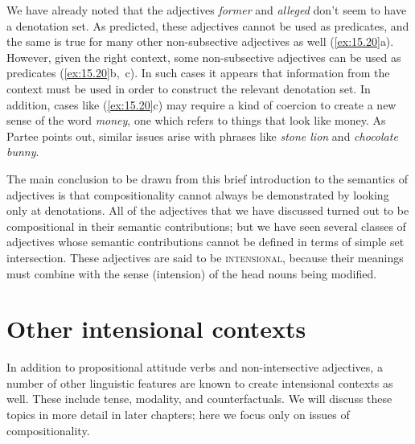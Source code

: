 \ea \label{ex:15.19}
                       \z
\z


We have already noted that the adjectives \textit{former} and \textit{alleged} don’t seem to have a denotation set. As predicted, these adjectives cannot be used as predicates, and the same is true for many other non-subsective adjectives as well (\ref{ex:15.20}a). However, given the right context, some non-subsective adjectives can be used as predicates (\ref{ex:15.20}b,~c). In such cases it appears that information from the context must be used in order to construct the relevant denotation set. In addition, cases like (\ref{ex:15.20}c) may require a kind of coercion to create a new sense of the word \textit{money}, one which refers to things that look like money. As Partee points out, similar issues arise with phrases like \textit{stone lion} and \textit{chocolate bunny}.


\ea \label{ex:15.20}
                       \z
\z


The main conclusion to be drawn from this brief introduction to the semantics of adjectives is that compositionality cannot always be demonstrated by looking only at denotations. All of the adjectives that we have discussed turned out to be compositional in their semantic contributions; but we have seen several classes of adjectives whose semantic contributions cannot be defined in terms of simple set intersection. These adjectives are said to be \textsc{intensional}, because their meanings must combine with the sense (intension) of the head nouns being modified.


\section{Other intensional contexts}\label{sec:15.4}\largerpage

In addition to propositional attitude verbs and non-intersective adjectives, a number of other linguistic features are known to create intensional contexts as well. These include tense, modality, and counterfactuals. We will discuss these topics in more detail in later chapters; here we focus only on issues of compositionality.


